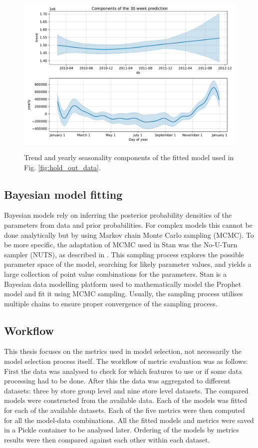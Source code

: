 \documentclass[english, 12pt, a4paper, sci, utf8, a-1b, online]{aaltothesis}
\begin{document}
\begin{abstractpage}[english]
\begin{figure}[htb]
	\centering
	\includegraphics[height=8cm]{../plots/forecasts/30_weeks_prediction_components_demo.pdf}
	\caption{Trend and yearly seasonality components of the fitted model used in Fig. \ref{fig:hold_out_data}.}
	\label{fig:prediction_components_demo}
\end{figure}

\subsection{Bayesian model fitting}

Bayesian models rely on inferring the posterior probability densities of the parameters from data and prior probabilities. For complex models this cannot be done analytically but by using Markov chain Monte Carlo sampling (MCMC). To be more specific, the adaptation of MCMC used in Stan was the No-U-Turn sampler (NUTS), as described in \cite{NUTS}. This sampling process explores the possible parameter space of the model, searching for likely parameter values, and yields a large collection of point value combinations for the parameters. Stan is a Bayesian data modelling platform used to mathematically model the Prophet model and fit it using MCMC sampling. Usually, the sampling process utilises multiple chains to ensure proper convergence of the sampling process.

\subsection{Workflow}

This thesis focuses on the metrics used in model selection, not necessarily the model selection process itself. The workflow of metric evaluation was as follows: First the data was analysed to check for which features to use or if some data processing had to be done. After this the data was aggregated to different datasets: three by store group level and nine store level datasets. The compared models were constructed from the available data. Each of the models was fitted for each of the available datasets. Each of the five metrics were then computed for all the model-data combinations. All the fitted models and metrics were saved in a Pickle container to be analysed later. Ordering of the models by metrics results were then compared against each other within each dataset.


\end{abstractpage}
\end{document}
